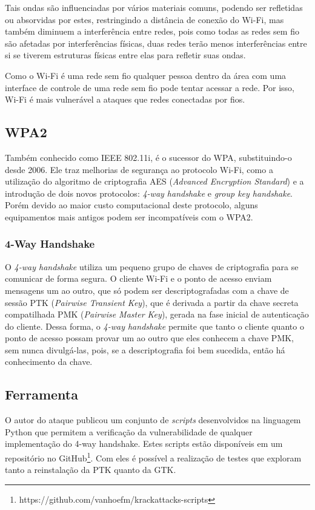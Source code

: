\documentclass[12pt]{article}
\begin{document}
Tais ondas são influenciadas por vários materiais comuns, podendo ser refletidas ou absorvidas por estes, restringindo a distância de conexão do Wi-Fi, mas também diminuem a interferência entre redes, pois como todas as redes sem fio são afetadas por interferências físicas, duas redes terão menos interferências entre si se tiverem estruturas físicas entre elas para refletir suas ondas.

Como o Wi-Fi é uma rede sem fio qualquer pessoa dentro da área com uma interface de controle de uma rede sem fio pode tentar acessar a rede. Por isso, Wi-Fi é mais vulnerável a ataques que redes conectadas por fios.

\subsection{WPA2}
	Também conhecido como IEEE 802.11i, é o sucessor do WPA, substituindo-o desde 2006.
Ele traz melhorias de segurança ao protocolo Wi-Fi, como a utilização do algoritmo de criptografia AES (\textit{Advanced Encryption Standard}) e a introdução de dois novos protocolos: \textit{4-way handshake} e \textit{group key handshake}. Porém devido ao maior custo computacional deste protocolo, alguns equipamentos mais antigos podem ser incompatíveis com o WPA2.

\subsubsection{4-Way Handshake}
O \textit{4-way handshake} utiliza um pequeno grupo de chaves de criptografia para se comunicar de forma segura.
O cliente Wi-Fi e o ponto de acesso enviam mensagens um ao outro, que só podem ser descriptografadas com a chave de sessão PTK (\textit{Pairwise Transient Key}), que é derivada a partir da chave secreta compatilhada PMK (\textit{Pairwise Master Key}), gerada na fase inicial de autenticação do cliente.
	Dessa forma, o \textit{4-way handshake} permite que tanto o cliente quanto o ponto de acesso possam provar um ao outro que eles conhecem a chave PMK, sem nunca divulgá-las, pois, se a descriptografia foi bem sucedida, então há conhecimento da chave.
	
\subsection{Ferramenta}
O autor do ataque publicou um conjunto de \textit{scripts} desenvolvidos na linguagem Python que permitem a verificação da vulnerabilidade de qualquer implementação do 4-way handshake. Estes scripts estão disponíveis em um repositório no GitHub\footnote{https://github.com/vanhoefm/krackattacks-scripts}. Com eles é possível a realização de testes que exploram tanto a reinstalação da PTK quanto da GTK.
\end{document}
